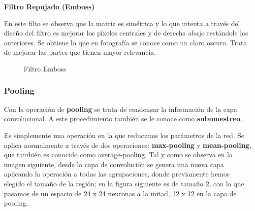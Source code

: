 \documentclass[
  a4paper,
  DIV=11,
  numbers=noendperiod]{scrreprt}
\begin{document}
\textbf{Filtro Repujado (Emboss)}

En este filto se observa que la matriz es simétrica y lo que intenta a
través del diseño del filtro es mejorar los píxeles centrales y de
derecha abajo restándole los anteriores. Se obtiene lo que en fotografía
se conoce como un claro oscuro. Trata de mejorar las partes que tienen
mayor relevancia.

\begin{figure}


\caption{\label{fig-filtro_emboss}Filtro Emboss}

\end{figure}%

\subsubsection{Pooling}\label{pooling}

Con la operación de \textbf{pooling} se trata de condensar la
información de la capa convolucional. A este procedimiento también se le
conoce como \textbf{submuestreo}.

Es simplemente una operación en la que reducimos los parámetros de la
red. Se aplica normalmente a través de dos operaciones:
\textbf{max-pooling} y \textbf{mean-pooling}, que también es conocido
como average-pooling. Tal y como se observa en la imagen siguiente,
desde la capa de convolución se genera una nueva capa aplicando la
operación a todas las agrupaciones, donde previamente hemos elegido el
tamaño de la región; en la figura siguiente es de tamaño 2, con lo que
pasamos de un espacio de 24 x 24 neuronas a la mitad, 12 x 12 en la capa
de pooling.
\end{document}
